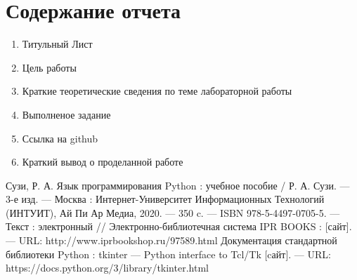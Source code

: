 \documentclass[a4paper]{article}
\begin{document}
\section{Содержание отчета}
\begin{enumerate}
  \item Титульный Лист
  \item Цель работы
  \item Краткие теоретические сведения по теме лабораторной работы
  \item Выполненое задание
  \item Ссылка на github
  \item Краткий вывод о проделанной работе
\end{enumerate}

\begin{thebibliography}{3}
  Сузи, Р. А. Язык программирования Python : учебное пособие / Р. А. Сузи. — 3-е изд. — Москва : Интернет-Университет Информационных Технологий (ИНТУИТ), Ай Пи Ар Медиа, 2020. — 350 c. — ISBN 978-5-4497-0705-5. — Текст : электронный // Электронно-библиотечная система IPR BOOKS : [сайт]. — URL: http://www.iprbookshop.ru/97589.html
   Документация стандартной библиотеки Python : tkinter — Python interface to Tcl/Tk [cайт]. --- URL: https://docs.python.org/3/library/tkinter.html
\end{thebibliography}
\end{document}
